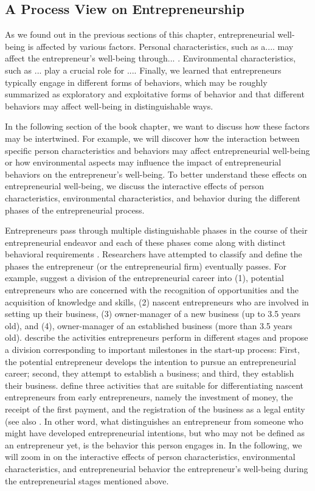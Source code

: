 \documentclass[a4paper,man,natbib]{apa6}
\begin{document}
\subsection{A Process View on Entrepreneurship}
As we found out in the previous sections of this chapter, entrepreneurial well-being is affected by various factors. Personal characteristics, such as a.... may affect the entrepreneur's well-being through... . Environmental characteristics, such as ... play a crucial role for .... Finally, we learned that entrepreneurs typically engage in different forms of behaviors, which may be roughly summarized as exploratory and exploitative forms of behavior and that different behaviors may affect well-being in distinguishable ways. \par
In the following section of the book chapter, we want to discuss how these factors may be intertwined. For example, we will discover how the interaction between specific person characteristics and behaviors may affect entrepreneurial well-being or how environmental aspects may influence the impact of entrepreneurial behaviors on the entrepreneur's well-being. To better understand these effects on entrepreneurial well-being, we discuss the interactive effects of person characteristics, environmental characteristics, and behavior during the different phases of the entrepreneurial process. \par
Entrepreneurs pass through multiple distinguishable phases in the course of their entrepreneurial endeavor and each of these phases come along with distinct behavioral requirements \cite[e.g.][]{Baron.2002, vanGelderen.2005}. Researchers have attempted to classify and define the phases the entrepreneur (or the entrepreneurial firm) eventually passes. For example, \cite{Bosma.2019} suggest a division of the entrepreneurial career into (1), potential entrepreneurs who are concerned with the recognition of opportunities and the acquisition of knowledge and skills, (2) nascent entrepreneurs who are involved in setting up their business, (3) owner-manager of a new business (up to 3.5 years old), and (4), owner-manager of an established business (more than 3.5 years old). \cite{Rotefoss.2005} describe the activities entrepreneurs perform in different stages and propose a division corresponding to important milestones in the start-up process: First, the potential entrepreneur develops the intention to pursue an entrepreneurial career; second, they attempt to establish a business; and third, they establish their business. \cite{Rotefoss.2005} define three activities that are suitable for differentiating nascent entrepreneurs from early entrepreneurs, namely the investment of money, the receipt of the first payment, and the registration of the business as a legal entity (see also \cite{Reynolds.1992}. In other word, what distinguishes an entrepreneur from someone who might have developed entrepreneurial intentions, but who may not be defined as an entrepreneur yet, is the behavior this person engages in. In the following, we will zoom in on the interactive effects of person characteristics, environmental characteristics, and entrepreneurial behavior the entrepreneur's well-being during the entrepreneurial stages mentioned above. 
\end{document}
